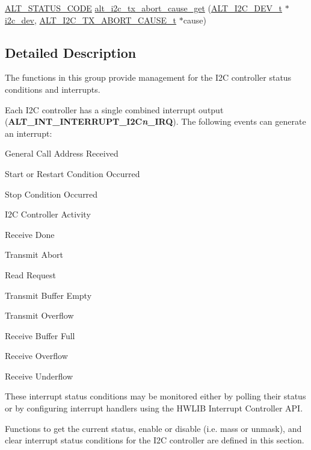 \begin{DoxyCompactItemize}
\item 
\mbox{\hyperlink{hwlib_8h_abdb0d369f069723ca55d6c94bcaaaa12}{A\+L\+T\+\_\+\+S\+T\+A\+T\+U\+S\+\_\+\+C\+O\+DE}} \mbox{\hyperlink{group__ALT__I2C__INT_gac5a4221442c1b5fd5aff9672ccf91ad1}{alt\+\_\+i2c\+\_\+tx\+\_\+abort\+\_\+cause\+\_\+get}} (\mbox{\hyperlink{structALT__I2C__DEV__s}{A\+L\+T\+\_\+\+I2\+C\+\_\+\+D\+E\+V\+\_\+t}} $\ast$\mbox{\hyperlink{structi2c__dev}{i2c\+\_\+dev}}, \mbox{\hyperlink{group__ALT__I2C_gae7ca3bb5e96b3425588a975987407738}{A\+L\+T\+\_\+\+I2\+C\+\_\+\+T\+X\+\_\+\+A\+B\+O\+R\+T\+\_\+\+C\+A\+U\+S\+E\+\_\+t}} $\ast$cause)
\end{DoxyCompactItemize}


\subsection{Detailed Description}
The functions in this group provide management for the I2C controller status conditions and interrupts.

Each I2C controller has a single combined interrupt output ({\bfseries{A\+L\+T\+\_\+\+I\+N\+T\+\_\+\+I\+N\+T\+E\+R\+R\+U\+P\+T\+\_\+\+I2C{\itshape n}\+\_\+\+I\+RQ}}). The following events can generate an interrupt\+:
\begin{DoxyItemize}
\item General Call Address Received
\item Start or Restart Condition Occurred
\item Stop Condition Occurred
\item I2C Controller Activity
\item Receive Done
\item Transmit Abort
\item Read Request
\item Transmit Buffer Empty
\item Transmit Overflow
\item Receive Buffer Full
\item Receive Overflow
\item Receive Underflow
\end{DoxyItemize}

These interrupt status conditions may be monitored either by polling their status or by configuring interrupt handlers using the H\+W\+L\+IB Interrupt Controller A\+PI.

Functions to get the current status, enable or disable (i.\+e. mass or unmask), and clear interrupt status conditions for the I2C controller are defined in this section. 

